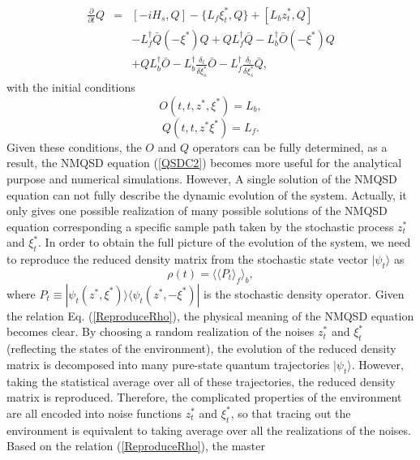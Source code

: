 \documentclass[preprint]{elsarticle}
\begin{document}
\noindent 
\begin{eqnarray}
\frac{\partial}{\partial t}Q & = & [-iH_{s},Q]-\{L_{f}\xi_{t}^{*},Q\}+[L_{b}z_{t}^{*},Q]\nonumber \\
 &  & -L_{f}^{\dagger}\bar{Q}(-\xi^{*})Q+QL_{f}^{\dagger}\bar{Q}-L_{b}^{\dagger}\bar{O}(-\xi^{*})Q\nonumber \\
 &  & +QL_{b}^{\dagger}\bar{O}-L_{b}^{\dagger}\frac{\delta_{l}}{\delta\xi_{s}^{\ast}}\bar{O}-L_{f}^{\dagger}\frac{\delta_{l}}{\delta\xi_{s}^{*}}\bar{Q}, \label{EqQ}
\end{eqnarray}
\noindent with the initial conditions 
\begin{equation}
O(t,t,z^{*},\xi^{*})=L_{b},
\end{equation}
\begin{equation}
Q(t,t,z^{*}\xi^{*})=L_{f}.
\end{equation}
Given these conditions, the $O$ and $Q$ operators can be fully determined,
as a result, the NMQSD equation (\ref{QSDC2}) becomes more useful for the analytical  
purpose and numerical simulations. However,
A single solution of the NMQSD equation can not fully describe the dynamic
evolution of the system. Actually, it only gives one possible realization
of many possible solutions of  the NMQSD equation corresponding a specific sample
path taken by the stochastic process  $z_{t}^{*}$
and $\xi_{t}^{*}$. In order to obtain the full picture of the evolution
of the system, we need to reproduce the reduced density matrix from
the stochastic state vector $|\psi_{t}\rangle$ as
\begin{equation}
\rho(t)=\langle\langle P_{t}\rangle_{f}\rangle_{b},\label{ReproduceRho}
\end{equation}
where $P_{t}\equiv|\psi_{t}(z^{*},\xi^{*})\rangle\langle\psi_{t}(z^{*},-\xi^{*})|$
is the stochastic density operator. Given the relation Eq. (\ref{ReproduceRho}),
the physical meaning of the NMQSD equation becomes clear. By choosing
a random realization of the noises $z_{t}^{*}$ and $\xi_{t}^{*}$
(reflecting the states of the environment), the evolution of the reduced
density matrix is decomposed into many pure-state quantum trajectories
$|\psi_{t}\rangle$. However, taking the statistical average over
all of these trajectories, the reduced density matrix is reproduced.
Therefore, the complicated properties of the environment are all encoded
into noise functions $z_{t}^{*}$ and $\xi_{t}^{*}$, so that tracing
out the environment is equivalent to taking average over all the realizations
of the noises. Based on the relation (\ref{ReproduceRho}), the master
\end{document}
